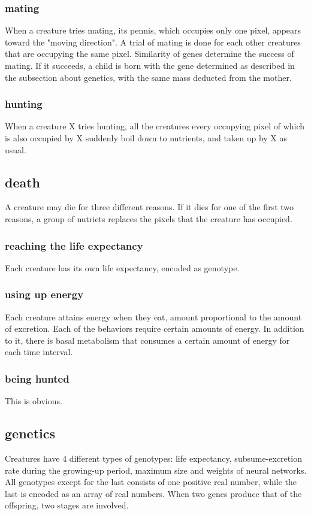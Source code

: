 \documentclass{article}
\numberwithin{equation}{section}
\begin{document}
\subsubsection{mating}
When a creature tries mating, its pennis, which occupies only one pixel, appears toward the "moving direction". A trial of mating is done for each other creatures that are occupying the same pixel. Similarity of genes determine the success of mating. If it succeeds, a child is born with the gene determined as described in the subsection about genetics, with the same mass deducted from the mother.
\subsubsection{hunting}
When a creature X tries hunting, all the creatures every occupying pixel of which is also occupied by X suddenly boil down to nutrients, and taken up by X as usual.
\subsection{death}
A creature may die for three different reasons. 
If it dies for one of the first two reasons, a group of nutriets replaces the pixels that the creature has occupied. 
\subsubsection{reaching the life expectancy}
Each creature has its own life expectancy, encoded as genotype.
\subsubsection{using up energy}
Each creature attains energy when they eat, amount proportional to the amount of excretion. Each of the behaviors require certain amounts of energy. In addition to it, there is basal metabolism that consumes a certain amount of energy for each time interval. 
\subsubsection{being hunted}
This is obvious. 

\subsection{genetics}
Creatures have 4 different types of genotypes: life expectancy, subsume-excretion rate during the growing-up period, maximum size and weights of neural networks. All genotypes except for the last consists of one positive real number, while the last is encoded as an array of real numbers. When two genes produce that of the offspring, two stages are involved.
\end{document}
